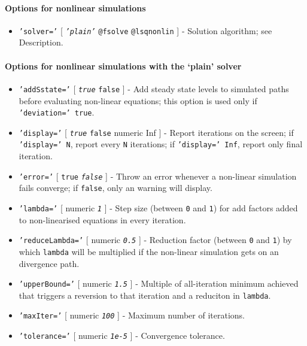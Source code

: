 \paragraph{Options for nonlinear
simulations}

\begin{itemize}
\itemsep1pt\parskip0pt
\item
  \texttt{'solver='} {[} \emph{\texttt{'plain'}} \textbar{}
  \texttt{@fsolve} \textbar{} \texttt{@lsqnonlin} {]} - Solution
  algorithm; see Description.
\end{itemize}

\paragraph{Options for nonlinear simulations with the `plain'
solver}

\begin{itemize}
\item
  \texttt{'addSstate='} {[} \emph{\texttt{true}} \textbar{}
  \texttt{false} {]} - Add steady state levels to simulated paths before
  evaluating non-linear equations; this option is used only if
  \texttt{'deviation=' true}.
\item
  \texttt{'display='} {[} \emph{\texttt{true}} \textbar{} \texttt{false}
  \textbar{} numeric \textbar{} Inf {]} - Report iterations on the
  screen; if \texttt{'display=' N}, report every \texttt{N} iterations;
  if \texttt{'display=' Inf}, report only final iteration.
\item
  \texttt{'error='} {[} \texttt{true} \textbar{} \emph{\texttt{false}}
  {]} - Throw an error whenever a non-linear simulation fails converge;
  if \texttt{false}, only an warning will display.
\item
  \texttt{'lambda='} {[} numeric \textbar{} \emph{\texttt{1}} {]} - Step
  size (between \texttt{0} and \texttt{1}) for add factors added to
  non-linearised equations in every iteration.
\item
  \texttt{'reduceLambda='} {[} numeric \textbar{} \emph{\texttt{0.5}}
  {]} - Reduction factor (between \texttt{0} and \texttt{1}) by which
  \texttt{lambda} will be multiplied if the non-linear simulation gets
  on an divergence path.
\item
  \texttt{'upperBound='} {[} numeric \textbar{} \emph{\texttt{1.5}} {]}
  - Multiple of all-iteration minimum achieved that triggers a reversion
  to that iteration and a reduciton in \texttt{lambda}.
\item
  \texttt{'maxIter='} {[} numeric \textbar{} \emph{\texttt{100}} {]} -
  Maximum number of iterations.
\item
  \texttt{'tolerance='} {[} numeric \textbar{} \emph{\texttt{1e-5}} {]}
  - Convergence tolerance.
\end{itemize}

